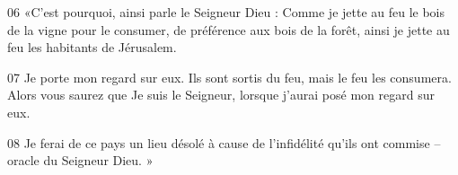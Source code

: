 
06 «C’est pourquoi, ainsi parle le Seigneur Dieu : Comme je jette au feu le bois de la vigne pour le consumer, de préférence aux bois de la forêt, ainsi je jette au feu les habitants de Jérusalem.

07 Je porte mon regard sur eux. Ils sont sortis du feu, mais le feu les consumera. Alors vous saurez que Je suis le Seigneur, lorsque j’aurai posé mon regard sur eux.

08 Je ferai de ce pays un lieu désolé à cause de l’infidélité qu’ils ont commise – oracle du Seigneur Dieu. »